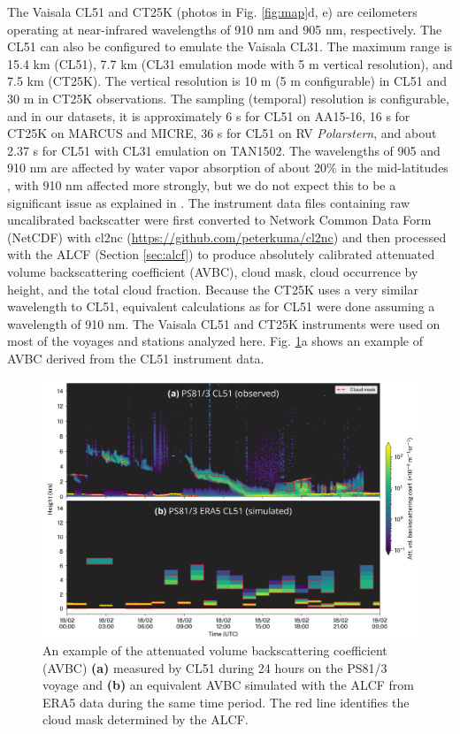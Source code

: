 \documentclass[draft]{agujournal2019}
\begin{document}
The Vaisala CL51 and CT25K (photos in Fig. \ref{fig:map}d, e) are ceilometers operating at near-infrared wavelengths of 910 nm and 905 nm, respectively. The CL51 can also be configured to emulate the Vaisala CL31. The maximum range is 15.4 km (CL51), 7.7 km (CL31 emulation mode with 5 m vertical resolution), and 7.5 km (CT25K). The vertical resolution is 10 m (5 m configurable) in CL51 and 30 m in CT25K observations. The sampling (temporal) resolution is configurable, and in our datasets, it is approximately 6 s for CL51 on AA15‐16, 16 s for CT25K on MARCUS and MICRE, 36 s for CL51 on RV \emph{Polarstern}, and about 2.37 s for CL51 with CL31 emulation on TAN1502. The wavelengths of 905 and 910 nm are affected by water vapor absorption of about 20\% in the mid-latitudes \cite{wiegner2015,wiegner2019}, with 910 nm affected more strongly, but we do not expect this to be a significant issue as explained in . The instrument data files containing raw uncalibrated backscatter were first converted to Network Common Data Form (NetCDF) with cl2nc (\url{https://github.com/peterkuma/cl2nc}) and then processed with the ALCF (Section \ref{sec:alcf}) to produce absolutely calibrated attenuated volume backscattering coefficient (AVBC), cloud mask, cloud occurrence by height, and the total cloud fraction. Because the CT25K uses a very similar wavelength to CL51, equivalent calculations as for CL51 were done assuming a wavelength of 910 nm. The Vaisala CL51 and CT25K instruments were used on most of the voyages and stations analyzed here. Fig. \ref{fig:example}a shows an example of AVBC derived from the CL51 instrument data.

\begin{figure}[b!]
\centering
\includegraphics[width=\textwidth]{img/example.png}
\caption{
An example of the attenuated volume backscattering coefficient (AVBC) \textbf{(a)} measured by CL51 during 24 hours on the PS81/3 voyage and \textbf{(b)} an equivalent AVBC simulated with the ALCF from ERA5 data during the same time period. The red line identifies the cloud mask determined by the ALCF.
}
\label{fig:example}
\end{figure}
\end{document}
